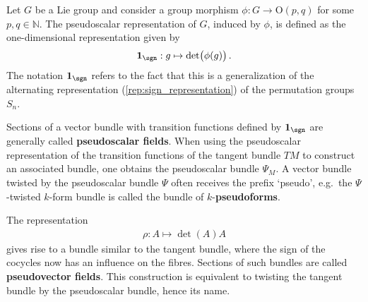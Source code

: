     \begin{example}[Pseudoscalars]
        Let $G$ be a Lie group and consider a group morphism $\phi:G\rightarrow\mathrm{O}(p,q)$ for some $p,q\in\mathbb{N}$. The pseudoscalar representation of $G$, induced by $\phi$, is defined as the one-dimensional representation given by
        \begin{gather}
            \mathbf{1}_{\sgn}:g\mapsto\det\bigl(\phi(g)\bigr)\,.
        \end{gather}
        The notation $\mathbf{1}_{\sgn}$ refers to the fact that this is a generalization of the alternating representation (\cref{rep:sign_representation}) of the permutation groups $S_n$.

        Sections of a vector bundle with transition functions defined by $\mathbf{1}_{\sgn}$ are generally called \textbf{pseudoscalar fields}. When using the pseudoscalar representation of the transition functions of the tangent bundle $TM$ to construct an associated bundle, one obtains the pseudoscalar bundle $\Psi_M$. A vector bundle twisted by the pseudoscalar bundle $\Psi$ often receives the prefix `pseudo', e.g.~the $\Psi$-twisted $k$-form bundle is called the bundle of $k$-\textbf{pseudoforms}.
    \end{example}
    \begin{example}[Pseudovectors]
        The representation
        \begin{gather}
            \rho:A\mapsto\det(A)A
        \end{gather}
        gives rise to a bundle similar to the tangent bundle, where the sign of the cocycles now has an influence on the fibres. Sections of such bundles are called \textbf{pseudovector fields}. This construction is equivalent to twisting the tangent bundle by the pseudoscalar bundle, hence its name.
    \end{example}

